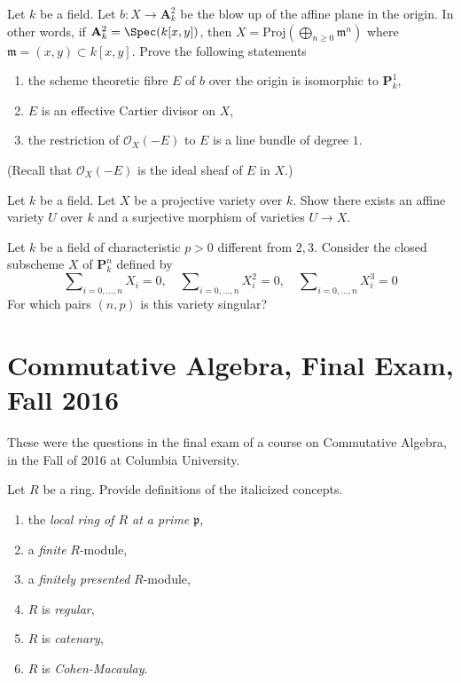 \begin{exercise}
\label{exercise-normal-bundle-exceptional-curve}
Let $k$ be a field. Let $b : X \to \mathbf{A}^2_k$ be the blow
up of the affine plane in the origin. In other words, if
$\mathbf{A}^2_k = \Spec(k[x, y])$, then
$X = \text{Proj}(\bigoplus_{n \geq 0} \mathfrak m^n)$
where $\mathfrak m = (x, y) \subset k[x, y]$.
Prove the following statements
\begin{enumerate}
\item the scheme theoretic fibre $E$ of $b$ over the origin
is isomorphic to $\mathbf{P}^1_k$,
\item $E$ is an effective Cartier divisor on $X$,
\item the restriction of $\mathcal{O}_X(-E)$
to $E$ is a line bundle of degree $1$.
\end{enumerate}
(Recall that $\mathcal{O}_X(-E)$ is the ideal sheaf of $E$ in $X$.)
\end{exercise}

\begin{exercise}
\label{exercise-surjective-map-affine-variety-projective-variety}
Let $k$ be a field. Let $X$ be a projective variety over $k$.
Show there exists an affine variety $U$ over $k$ and a surjective
morphism of varieties $U \to X$.
\end{exercise}

\begin{exercise}
\label{exercise-vandermonde}
Let $k$ be a field of characteristic $p > 0$ different from $2,3$.
Consider the closed subscheme $X$ of $\mathbf{P}^n_k$ defined by
$$
\sum\nolimits_{i = 0, \ldots, n} X_i = 0,\quad
\sum\nolimits_{i = 0, \ldots, n} X_i^2 = 0,\quad
\sum\nolimits_{i = 0, \ldots, n} X_i^3 = 0
$$
For which pairs $(n, p)$ is this variety singular?
\end{exercise}






\section{Commutative Algebra, Final Exam, Fall 2016}
\label{section-final-exam-fall-2016}

\noindent
These were the questions in the final exam of a course on
Commutative Algebra, in the Fall of 2016 at Columbia University.

\begin{exercise}[Definitions]
\label{exercise-definitions-fall-2016}
Let $R$ be a ring.
Provide definitions of the italicized concepts.
\begin{enumerate}
\item the {\it local ring of $R$ at a prime $\mathfrak p$},
\item a {\it finite} $R$-module,
\item a {\it finitely presented} $R$-module,
\item $R$ is {\it regular},
\item $R$ is {\it catenary},
\item $R$ is {\it Cohen-Macaulay}.
\end{enumerate}
\end{exercise}


